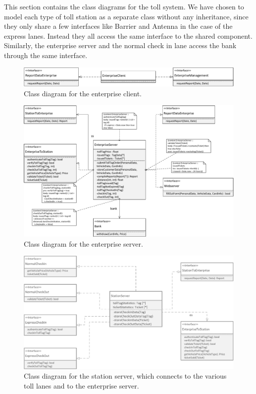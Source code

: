 This section contains the class diagrams for the toll system. We have chosen to model each type of toll station as a separate class without any inheritance, since they only share a few interfaces like Barrier and Antenna in the case of the express lanes. Instead they all access the same interface to the shared component. Similarly, the enterprise server and the normal check in lane access the bank through the same interface.

\begin{figure}[H]
\centerline{\includegraphics[width=\textwidth]{img/class_diagrams/class_diagram_enterprise_client}}
\caption{Class diagram for the enterprise client.}
\label{fig:cld_ec}
\end{figure}

\begin{figure}[H]
\centerline{\includegraphics[width=\textwidth]{img/class_diagrams/class_diagram_enterprise_server}}
\caption{Class diagram for the enterprise server.}
\label{fig:cld_es}
\end{figure}

\begin{figure}[H]
\centerline{\includegraphics[width=\textwidth]{img/class_diagrams/class_diagram_station_server}}
\caption{Class diagram for the station server, which connects to the various toll lanes and to the enterprise server.}
\label{fig:cld_ss}
\end{figure}

